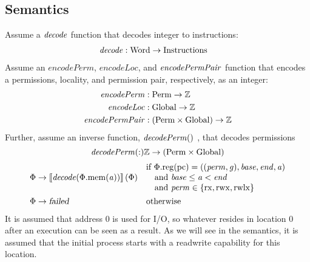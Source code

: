 \documentclass[a4paper]{article}
\newcommand{\sem}[1]{\left\llbracket #1 \right\rrbracket}
\newcommand{\fun}{\rightarrow}
\newcommand{\var}[1]{\mathit{#1}}
\newcommand{\gl}{\var{g}}
\newcommand{\pcreg}{\mathrm{pc}}
\newcommand{\addr}{\var{a}}
\newcommand{\start}{\var{base}}
\newcommand{\addrend}{\var{end}}
\newcommand{\perm}{\var{perm}}
\newcommand{\stdcap}[1][(\perm,\gl)]{\left(#1,\start,\addrend,\addr \right)}
\newcommand{\plainproj}[1]{\mathrm{#1}}
\newcommand{\memheap}[1][\Phi]{#1.\plainproj{mem}}
\newcommand{\memreg}[1][\Phi]{#1.\plainproj{reg}}
\newcommand{\failed}{\textsl{failed}}
\newcommand{\plainfun}[2]{
  \ifthenelse{\equal{#2}{}}
             {\mathit{#1}}
             {\mathit{#1}(#2)}
}
\newcommand{\decode}{\plainfun{decode}{}}
\newcommand{\encodePerm}{\mathit{encodePerm}}
\newcommand{\encodePermPair}{\plainfun{encodePermPair}{}}
\newcommand{\encodeLoc}{\mathit{encodeLoc}{}}
\newcommand{\decodePermPair}{\plainfun{decodePerm}}
\newcommand{\plaindom}[1]{\mathrm{#1}}
\newcommand{\Words}{\plaindom{Word}}
\newcommand{\Instrs}{\plaindom{Instructions}}
\newcommand{\ints}{\mathbb{Z}}
\newcommand{\Perms}{\plaindom{Perm}}
\newcommand{\Globals}{\plaindom{Global}}
\newcommand{\plainperm}[1]{\mathrm{#1}}
\newcommand{\exec}{\plainperm{rx}}
\newcommand{\rwx}{\plainperm{rwx}}
\newcommand{\rwlx}{\plainperm{rwlx}}
\begin{document}
\subsection*{Semantics}
Assume a $\decode$ function that decodes integer to instructions:
\begin{align*}
\decode &:\Words \fun \Instrs
\end{align*}
Assume an $\encodePerm$, $\encodeLoc$, and $\encodePermPair$ function that encodes a permissions, locality, and permission pair, respectively, as an integer:
\begin{align*}
\encodePerm &: \Perms \fun \ints \\
\encodeLoc &: \Globals \fun \ints \\
\encodePermPair &: (\Perms \times \Globals) \fun \ints \\
\end{align*}
Further, assume an inverse function, $\decodePermPair$, that decodes permissions
\[
  \decodePermPair : \ints \fun (\Perms \times \Globals)
\]
\begin{align*}
  \Phi & \rightarrow \sem{\decode(\memheap(\addr))}(\Phi) & &                                   
                                                              \arraycolsep=0pt
                                                              \begin{array}{l}
                                                                \text{if $\memreg(\pcreg) = \stdcap$}\\
                                                                \quad\text{and $\start \leq \addr < \addrend$}\\
                                                                \quad\text{and $\perm \in \{ \exec,\rwx, \rwlx \}$ }
                                                              \end{array}\\
\Phi & \rightarrow \failed                                 & & \text{otherwise}
\end{align*}
It is assumed that address 0 is used for I/O, so whatever resides in location 0 after an execution can be seen as a result. As we will see in the semantics, it is assumed that the initial process starts with a readwrite capability for this location.
\end{document}
